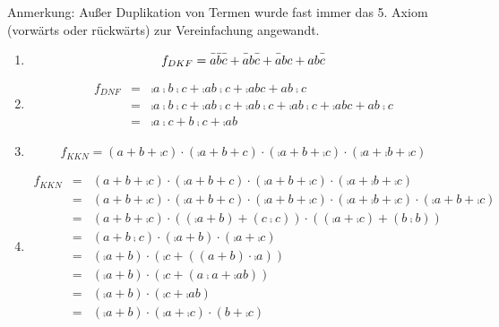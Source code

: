 \documentclass{CInf_practice}
\begin{document}
\cinftitle

Anmerkung: Außer Duplikation von Termen wurde fast immer das 5. Axiom (vorwärts
oder rückwärts) zur Vereinfachung angewandt.

\begin{enumerate}[label=\alph{*})]
   \item
      \begin{equation*}
         f_{DKF} = \comp a\comp b \comp c + \comp a b\comp c + \comp a b c + 
         a b\comp c \\
      \end{equation*}
   \item
      \begin{eqnarray*}
         f_{DNF} & = & \comp a\comp b \comp c + \comp a b\comp c + \comp a b c + 
         a b\comp c \\
                 & = & \comp a \comp b \comp c + \comp a b \comp c + \comp a b
                       \comp c + \comp a b \comp c + \comp a b c + a b \comp c \\
                 & = & \comp a \comp c + b \comp c + \comp a b
      \end{eqnarray*}
   \item
      \begin{equation*}
         f_{KKN} = (a + b + \comp c) \cdot (\comp a + b + c) \cdot (\comp a
         + b  +\comp c) \cdot (\comp a + \comp b  +\comp c)
      \end{equation*}
   \item
      \begin{eqnarray*}
         f_{KKN} & = & (a + b + \comp c) \cdot (\comp a + b + c) \cdot (\comp a + b  +\comp c) \cdot (\comp a + \comp b  +\comp c) \\
                 & = & (a + b + \comp c) \cdot (\comp a + b + c) \cdot (\comp a
                        + b  +\comp c) \cdot (\comp a + \comp b  +\comp c) \cdot (\comp a + b + \comp c)\\
                 & = & (a + b + \comp c) \cdot ((\comp a + b) + (c\comp c)) \cdot ((\comp a + \comp c) + (b\comp b)) \\
                 & = & (a + b \comp c) \cdot (\comp a + b) \cdot (\comp a + \comp c) \\
                 & = & (\comp a + b) \cdot (\comp c + ((a + b)\cdot\comp a)) \\
                 & = & (\comp a + b) \cdot (\comp c + (a\comp a + \comp a b)) \\
                 & = & (\comp a + b) \cdot (\comp c + \comp a b) \\
                 & = & (\comp a + b) \cdot (\comp a + \comp c) \cdot (b + \comp c)
      \end{eqnarray*}


\end{enumerate}
\end{document}

